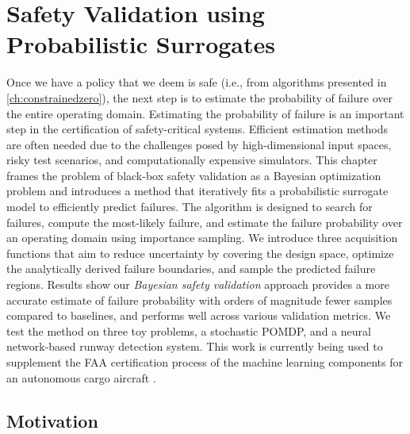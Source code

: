 \chapter{Safety Validation using Probabilistic Surrogates}\label{ch:bsv}

Once we have a policy that we deem is safe (i.e., from algorithms presented in \cref{ch:constrainedzero}), the next step is to estimate the probability of failure over the entire operating domain.
Estimating the probability of failure is an important step in the certification of safety-critical systems.
Efficient estimation methods are often needed due to the challenges posed by high-dimensional input spaces, risky test scenarios, and computationally expensive simulators.
This chapter frames the problem of black-box safety validation as a Bayesian optimization problem and introduces a method that iteratively fits a probabilistic surrogate model to efficiently predict failures.
The algorithm is designed to search for failures, compute the most-likely failure, and estimate the failure probability over an operating domain using importance sampling.
We introduce three acquisition functions that aim to reduce uncertainty by covering the design space, optimize the analytically derived failure boundaries, and sample the predicted failure regions.
Results show our \textit{Bayesian safety validation} approach provides a more accurate estimate of failure probability with orders of magnitude fewer samples compared to baselines, and performs well across various validation metrics.
We test the method on three toy problems, a stochastic POMDP, and a neural network-based runway detection system.
This work is currently being used to supplement the FAA certification process of the machine learning components for an autonomous cargo aircraft \cite{durand2023formal}.

\section{Motivation}

